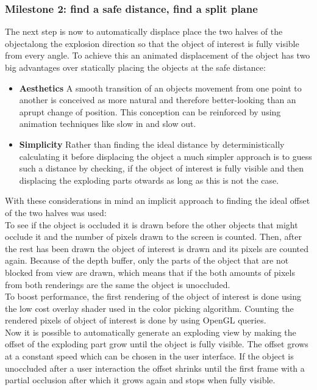 \subsubsection{Milestone 2: find a safe distance, find a split plane} 
The next step is now to automatically displace place the two halves of the objectalong the explosion direction so that the object of interest is fully visible from every angle. To achieve this an animated displacement of the object has two big advantages over statically placing the objects at the safe distance:\\
\begin{itemize}
\item \textbf{Aesthetics} A smooth transition of an objects movement from one point to another is conceived as more natural and therefore better-looking than an aprupt change of position. This conception can be reinforced by using animation techniques like slow in and slow out.\cite{misc:siggraphAnim}
\item \textbf{Simplicity} Rather than finding the ideal distance by deterministically calculating it before displacing the object a much simpler approach is to guess such a distance by checking, if the object of interest is fully visible and then displacing the exploding parts otwards as long as this is not the case.
\end{itemize}
With these considerations in mind an implicit approach to finding the ideal offset of the two halves was used:\\
To see if the object is occluded it is drawn before the other objects that might occlude it and the number of pixels drawn to the screen is counted. Then, after the rest has been drawn the object of interest is drawn and its pixels are counted again. Because of the depth buffer, only the parts of the object that are not blocked from view are drawn, which means that if the both amounts of pixels from both renderings are the same the object is unoccluded.\\
To boost performance, the first rendering of the object of interest is done using the low cost overlay shader used in the color picking algorithm. Counting the rendered pixels of object of interest is done by using OpenGL queries. \\
Now it is possible to automatically generate an exploding view by making the offset of the exploding part grow until the object is fully visible. The offset grows at a constant speed which can be chosen in the user interface. If the object is unoccluded after a user interaction the offset shrinks until the first frame with a partial occlusion after which it grows again and stops when fully visible.\\ 
